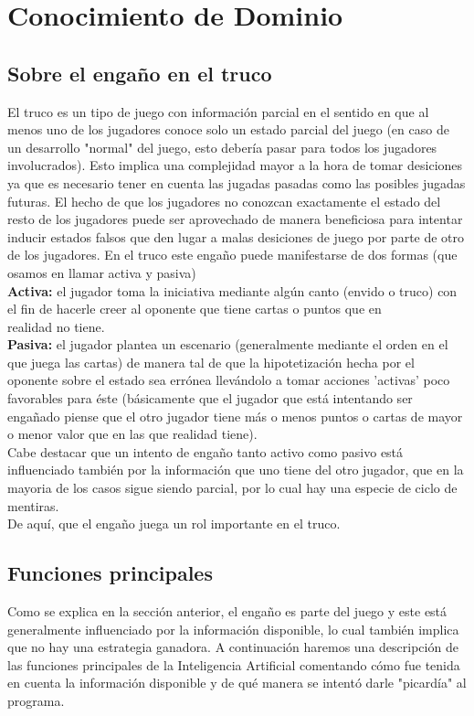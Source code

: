 \documentclass[12pt,a4paper]{article}
\begin{document}
\section{Conocimiento de Dominio}

\subsection{Sobre el enga\~no en el truco}

El truco es un tipo de juego con informaci\'on parcial en el sentido en que al menos uno de los jugadores
conoce solo un estado parcial del juego (en caso de un desarrollo "normal" del juego, esto deber\'ia 
pasar para todos los jugadores involucrados). Esto implica una complejidad mayor a la hora de tomar desiciones
ya que es necesario tener en cuenta las jugadas pasadas como las posibles jugadas futuras. 
El hecho de que los jugadores no conozcan exactamente el estado del resto de los jugadores puede ser aprovechado
de manera beneficiosa para intentar inducir estados falsos que den lugar a malas desiciones de juego 
por parte de otro de los jugadores. En el truco este enga\~no puede manifestarse de dos formas (que osamos en llamar
activa y pasiva)\\
\textbf{Activa:} el jugador toma la iniciativa mediante alg\'un canto (envido o truco) con el fin de hacerle creer al oponente que tiene
cartas o puntos que en \\ realidad no tiene.\\
\textbf{Pasiva:} el jugador plantea un escenario (generalmente mediante el orden en el que juega las cartas) de manera tal de que 
la hipotetizaci\'on hecha por el oponente sobre el estado sea err\'onea llev\'andolo a tomar acciones 'activas' poco favorables para 
\'este (b\'asicamente que el jugador que est\'a intentando ser enga\~nado piense que el otro jugador tiene m\'as o menos puntos o cartas de 
mayor o menor valor que en las que realidad tiene).\\
Cabe destacar que un intento de enga\~no tanto activo como pasivo est\'a influenciado tambi\'en por la informaci\'on que uno tiene del otro jugador,
que en la mayoria de los casos sigue siendo parcial,  por lo cual hay una especie de ciclo de mentiras.\\
De aqu\'i, que el enga\~no juega un rol importante en el truco.

\subsection{Funciones principales}
Como se explica en la secci\'on anterior, el enga\~no es parte del juego y este est\'a generalmente influenciado por
la informaci\'on disponible, lo cual tambi\'en implica que no hay una estrategia ganadora. 
A continuaci\'on haremos una descripci\'on de las funciones principales de la Inteligencia Artificial comentando c\'omo fue tenida en cuenta la 
informaci\'on disponible y de qu\'e manera se intent\'o darle "picard\'ia" al programa.
\end{document}
